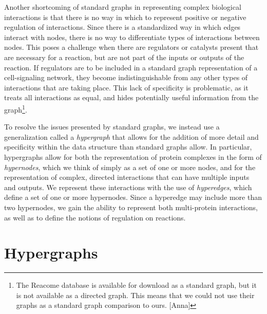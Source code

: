 \documentclass[12pt,twoside]{reedthesis}
\newcommand{\new}[2]{{\color{red}#1 [#2]}}
\theoremstyle{definition}
\begin{document}
Another shortcoming of standard graphs in representing complex biological interactions is that there is no way in which to represent positive or negative regulation of interactions.  Since there is a standardized way in which edges interact with nodes, there is no way to differentiate types of interactions between nodes.  This poses a challenge when there are regulators or catalysts present that are necessary for a reaction, but are not part of the inputs or outputs of the reaction.  If regulators are to be included in a standard graph representation of a cell-signaling network, they become indistinguishable from any other types of interactions that are taking place.  This lack of specificity is problematic, as it treats all interactions as equal, and hides potentially useful information from the graph\footnote{\new{The Reacome database is available for download as a standard graph, but it is not available as a directed graph. This means that we could not use their graphs as a standard graph comparison to ours.}{Anna}}.\par

To resolve the issues presented by standard graphs, we instead use a generalization called a \textit{hypergraph} that allows for the addition of more detail  and specificity within the data structure than standard graphs allow.  In particular, hypergraphs allow for both the representation of protein complexes in the form of \textit{hypernodes}, which we think of simply as a set of one or more nodes, and for the representation of complex, directed interactions that can have multiple inputs and outputs.  We represent these interactions with the use of \textit{hyperedges}, which define a set of one or more hypernodes.  Since a hyperedge may include more than two hypernodes, we gain the ability to represent both multi-protein interactions, as well as to define the notions of regulation on reactions.\par

\section{Hypergraphs}
\end{document}
